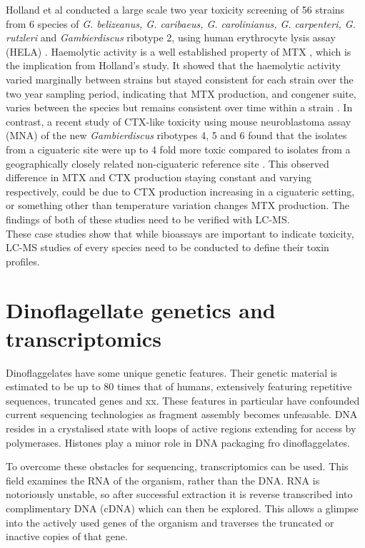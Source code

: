 \documentclass[12pt]{article}
\begin{document}
Holland et al conducted a large scale two year toxicity screening of 56 strains from 6 species of \emph{G. belizeanus, G. caribaeus, G. carolinianus, G. carpenteri, G. rutzleri} and  \emph{Gambierdiscus} ribotype 2, using human erythrocyte lysis assay (HELA) \cite{holland2013differences}. Haemolytic activity is a well established property of MTX \cite{igarashi1999mechanisms}, which is the implication from Holland's study. It showed that the haemolytic activity varied marginally between strains but stayed consistent for each strain over the two year sampling period, indicating that MTX production, and congener suite, varies between the species but remains consistent over time within a strain \cite{holland2013differences}.
In contrast, a recent study of CTX-like toxicity using mouse neuroblastoma assay (MNA) of the new \emph{Gambierdiscus} ribotypes 4, 5 and 6 found that the isolates from a ciguateric site were up to 4\- fold more toxic compared to isolates from a geographically closely related non-ciguateric reference site \cite{xu2014distribution}. This observed difference in MTX and CTX production staying constant and varying respectively, could be due to CTX production increasing in a ciguateric setting, or something other than temperature variation changes MTX production. The findings of both of these studies need to be verified with LC-MS. \\

These case studies show that while bioassays are important to indicate toxicity, LC-MS studies of every species need to be conducted to define their toxin profiles.

\section{Dinoflagellate genetics and transcriptomics}
Dinoflaggelates have some unique genetic features. Their genetic material is estimated to be up to 80 times that of humans, extensively featuring repetitive sequences, truncated genes and xx. These features in particular have confounded current sequencing technologies as fragment assembly becomes unfeasable. DNA resides in a crystalised state with loops of active regions extending for access by polymerases. Histones play a minor role in DNA packaging fro dinoflaggelates.

To overcome these obstacles for sequencing, transcriptomics can be used. This field examines the RNA of the organism, rather than the DNA. RNA is notoriously unstable, so after successful extraction it is reverse transcribed into complimentary DNA (cDNA) which can then be explored. This allows a glimpse into the actively used genes of the organism and traverses the truncated or inactive copies of that gene.
\end{document}
